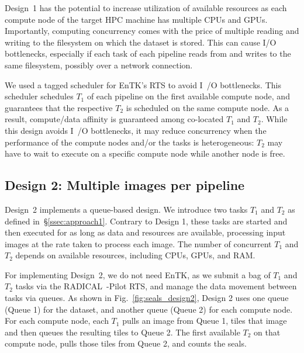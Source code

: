 Design~1 has the potential to increase utilization of available resources as each compute node of the target HPC machine has multiple CPUs and GPUs.
Importantly, computing concurrency comes with the price of multiple reading and writing to the filesystem on which the dataset is stored.
This can cause I/O bottlenecks, especially if each task of each pipeline reads from and writes to the same filesystem, possibly over a network connection.

We used a tagged scheduler for EnTK's RTS to avoid I~/O bottlenecks.
This scheduler schedules $T_{1}$ of each pipeline on the first available compute node, and guarantees that the respective $T_{2}$ is scheduled on the same compute node.
As a result, compute/data affinity is guaranteed among co-located $T_{1}$ and $T_{2}$.
While this design avoids I~/O bottlenecks, it may reduce concurrency when the performance of the compute nodes and/or the tasks is heterogeneous: $T_{2}$ may have to wait to execute on a specific compute node while another node is free.


\subsection{Design 2: Multiple images per pipeline}\label{ssec:approach2}

Design~2 implements a queue-based design.
We introduce two tasks $T_{1}$ and $T_{2}$ as defined in~\S\ref{ssec:approach1}.
Contrary to Design 1, these tasks are started and then executed for as long as data and resources are available, processing input images at the rate taken to process each image.
The number of concurrent $T_{1}$ and $T_{2}$ depends on available resources, including CPUs, GPUs, and RAM.

For implementing Design~2, we do not need EnTK, as we submit a bag of $T_{1}$ and $T_{2}$ tasks via the RADICAL~-Pilot RTS, and manage the data movement between tasks via queues.
As shown in Fig.~\ref{fig:seals_design2}, Design 2 uses one queue (Queue 1) for the dataset, and another queue (Queue 2) for each compute node.
For each compute node, each $T_{1}$ pulls an image from Queue 1, tiles that image and then queues the resulting tiles to Queue 2.
The first available $T_{2}$ on that compute node, pulls those tiles from Queue 2, and counts the seals.



